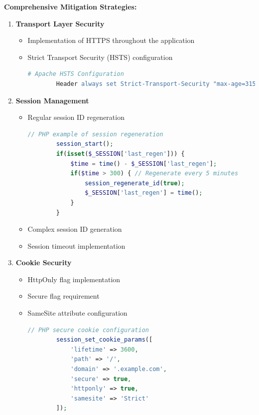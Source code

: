 \documentclass[12pt]{article}
\begin{document}
\textbf{Comprehensive Mitigation Strategies:}
\begin{enumerate}
    \item \textbf{Transport Layer Security}
    \begin{itemize}
        \item Implementation of HTTPS throughout the application
        \item Strict Transport Security (HSTS) configuration
        \begin{lstlisting}[language=Apache]
        # Apache HSTS Configuration
        Header always set Strict-Transport-Security "max-age=31536000; includeSubDomains"
        \end{lstlisting}
    \end{itemize}

    \item \textbf{Session Management}
    \begin{itemize}
        \item Regular session ID regeneration
        \begin{lstlisting}[language=PHP]
        // PHP example of session regeneration
        session_start();
        if(isset($_SESSION['last_regen'])) {
            $time = time() - $_SESSION['last_regen'];
            if($time > 300) { // Regenerate every 5 minutes
                session_regenerate_id(true);
                $_SESSION['last_regen'] = time();
            }
        }
        \end{lstlisting}
        \item Complex session ID generation
        \item Session timeout implementation
    \end{itemize}

    \item \textbf{Cookie Security}
    \begin{itemize}
        \item HttpOnly flag implementation
        \item Secure flag requirement
        \item SameSite attribute configuration
        \begin{lstlisting}[language=PHP]
        // PHP secure cookie configuration
        session_set_cookie_params([
            'lifetime' => 3600,
            'path' => '/',
            'domain' => '.example.com',
            'secure' => true,
            'httponly' => true,
            'samesite' => 'Strict'
        ]);
        \end{lstlisting}
    \end{itemize}


\end{enumerate}
\end{document}
